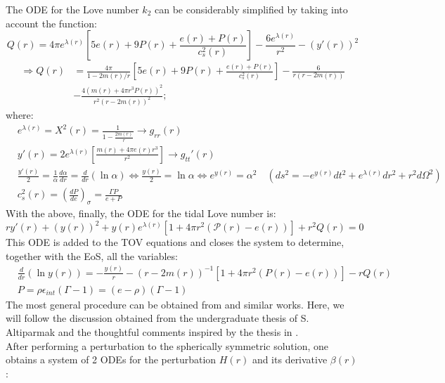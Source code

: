 \documentclass[12pt]{report}
\begin{document}
	The ODE for the Love number $k_2$ can be considerably simplified by taking into account the function:
	\begin{equation}Q(r) = 4\pi e^{\lambda(r)}\left[5e(r)+9P(r)+\frac{e(r)+P(r)}{c_s^2(r)}\right] - \frac{6e^{\lambda(r)}}{r^2} - (y'(r))^2\end{equation}
	\begin{align}
		\Rightarrow Q(r) &= \frac{4\pi}{1-2m(r)/r}\left[5e(r)+9P(r)+\frac{e(r)+P(r)}{c_s^2(r)}\right]- \frac{6}{r(r-2m(r))}  \nonumber \\
		& - \frac{4(m(r)+4\pi r^3P(r))^2}{r^2(r-2m(r))^2};
	\end{align}
	where:
	\begin{align}
		& e^{\lambda(r)} = X^2(r) = \frac{1}{1-\frac{2m(r)}{r}} \longrightarrow g_{rr}(r)\\
		& y'(r) = 2e^{\lambda(r)}\left[\frac{m(r) + 4\pi e(r)r^3}{r^2}\right] \longrightarrow g_{tt}'(r)\\
		& \frac{y'(r)}{2} = \frac{1}{\alpha}\frac{d\alpha}{dr} = \frac{d}{dr}(\ln\alpha) \Leftrightarrow \frac{y(r)}{2} = \ln \alpha \Leftrightarrow e^{y(r)} = \alpha^2\quad\left(ds^2 = -e^{y(r)}dt^2 + e^{\lambda(r)}dr^2 + r^2d\Omega^2\right)\\
		& c_s^2(r) = \left(\frac{dP}{de}\right)_{\sigma} = \frac{\Gamma P}{e + P}
	\end{align}
	With the above, finally, the ODE for the tidal Love number is:
	\begin{equation}
		ry'(r) + (y(r))^2 + y(r)e^{\lambda(r)}\left[1 + 4\pi r^2(\mathcal{P}(r)-e(r))\right] + r^2Q(r) = 0
	\end{equation}
	This ODE is added to the TOV equations and closes the system to determine, together with the EoS, all the variables:
	\begin{align}
		&\frac{d}{dr}(\ln y(r)) = -\frac{y(r)}{r} - (r-2m(r))^{-1}\left[1+4\pi r^2(P(r)-e(r))\right] - rQ(r)\\
		& P= \rho \epsilon_{int}(\Gamma-1) = (e-\rho)(\Gamma-1)
	\end{align}
	The most general procedure can be obtained from \cite{2010PhRvD..81l3016H} and similar works. Here, we will follow the discussion obtained from the undergraduate thesis of S. Altiparmak and the thoughtful comments inspired by the thesis in \cite{2022ApJ...939L..34A}. \\
	
	After performing a perturbation to the spherically symmetric solution, one obtains a system of 2 ODEs for the perturbation $H(r)$ and its derivative $\beta(r)$:
	
\end{document}
